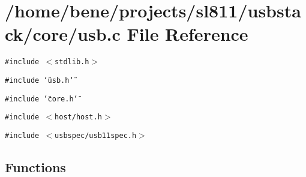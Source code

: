 \section{/home/bene/projects/sl811/usbstack/core/usb.c File Reference}
\label{usb_8c}
{\tt \#include $<$stdlib.h$>$}\par
{\tt \#include \char`\"{}usb.h\char`\"{}}\par
{\tt \#include \char`\"{}core.h\char`\"{}}\par
{\tt \#include $<$host/host.h$>$}\par
{\tt \#include $<$usbspec/usb11spec.h$>$}\par
\subsection*{Functions}
